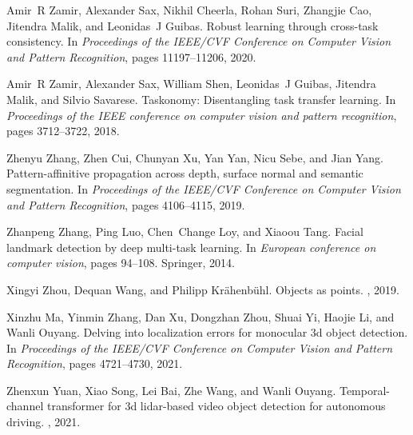 \documentclass[10pt,twocolumn,letterpaper]{article}
\begin{document}
{\begin{thebibliography}{10}
Amir~R Zamir, Alexander Sax, Nikhil Cheerla, Rohan Suri, Zhangjie Cao, Jitendra
  Malik, and Leonidas~J Guibas.
\newblock Robust learning through cross-task consistency.
\newblock In {\em Proceedings of the IEEE/CVF Conference on Computer Vision and
  Pattern Recognition}, pages 11197--11206, 2020.

Amir~R Zamir, Alexander Sax, William Shen, Leonidas~J Guibas, Jitendra Malik,
  and Silvio Savarese.
\newblock Taskonomy: Disentangling task transfer learning.
\newblock In {\em Proceedings of the IEEE conference on computer vision and
  pattern recognition}, pages 3712--3722, 2018.

Zhenyu Zhang, Zhen Cui, Chunyan Xu, Yan Yan, Nicu Sebe, and Jian Yang.
\newblock Pattern-affinitive propagation across depth, surface normal and
  semantic segmentation.
\newblock In {\em Proceedings of the IEEE/CVF Conference on Computer Vision and
  Pattern Recognition}, pages 4106--4115, 2019.

Zhanpeng Zhang, Ping Luo, Chen~Change Loy, and Xiaoou Tang.
\newblock Facial landmark detection by deep multi-task learning.
\newblock In {\em European conference on computer vision}, pages 94--108.
  Springer, 2014.

Xingyi Zhou, Dequan Wang, and Philipp Kr{\"a}henb{\"u}hl.
\newblock Objects as points.
, 2019.

Xinzhu Ma, Yinmin Zhang, Dan Xu, Dongzhan Zhou, Shuai Yi, Haojie Li, and Wanli
  Ouyang.
\newblock Delving into localization errors for monocular 3d object detection.
\newblock In {\em Proceedings of the IEEE/CVF Conference on Computer Vision and
  Pattern Recognition}, pages 4721--4730, 2021.

Zhenxun Yuan, Xiao Song, Lei Bai, Zhe Wang, and Wanli Ouyang.
\newblock Temporal-channel transformer for 3d lidar-based video object
  detection for autonomous driving.
,
  2021.

\end{thebibliography}

}
\end{document}

